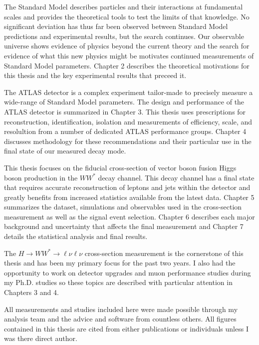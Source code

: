 The Standard Model describes particles and their interactions at fundamental scales and provides the theoretical tools to test the limits of that knowledge. No significant deviation has thus far been observed between Standard Model predictions and experimental results, but the search continues. Our observable universe shows evidence of physics beyond the current theory and the search for evidence of what this new physics might be motivates continued measurements of Standard Model parameters. Chapter 2 describes the theoretical motivations for this thesis and the key experimental results that preceed it. 
 
The ATLAS detector is a complex experiment tailor-made to precisely measure a wide-range of Standard Model parameters. The design and performance of the ATLAS detector is summarized in Chapter 3. This thesis uses prescriptions for reconstruction, identification, isolation and measurements of efficiency, scale, and resolultion from a number of dedicated ATLAS performance groups. Chapter 4 discusses methodology for these recommendations and their particular use in the final state of our measured decay mode. 

 This thesis focuses on the fiducial cross-section of vector boson fusion Higgs boson production in the $WW^*$ decay channel. This decay channel has a final state that requires accurate reconstruction of leptons and jets within the detector and greatly benefits from increased statistics available from the latest data. Chapter 5 summarizes the dataset, simulations and observables used in the cross-section measurement as well as the signal event selection. Chapter 6 describes each major background and uncertainty that affects the final measurement and Chapter 7 details the statistical analysis and final results.  

The $H\rightarrow WW^*\rightarrow \ell\nu\ell\nu$ cross-section measurement is the cornerstone of this thesis and has been my primary focus for the past two years. I also had the opportunity to work on detector upgrades and muon performance studies during my Ph.D. studies so these topics are described with particular attention in Chapters 3 and 4. 

All measurements and studies included here were made possible through my analysis team and the advice and software from countless others. All figures contained in this thesis are cited from either publications or individuals unless I was there direct author.

